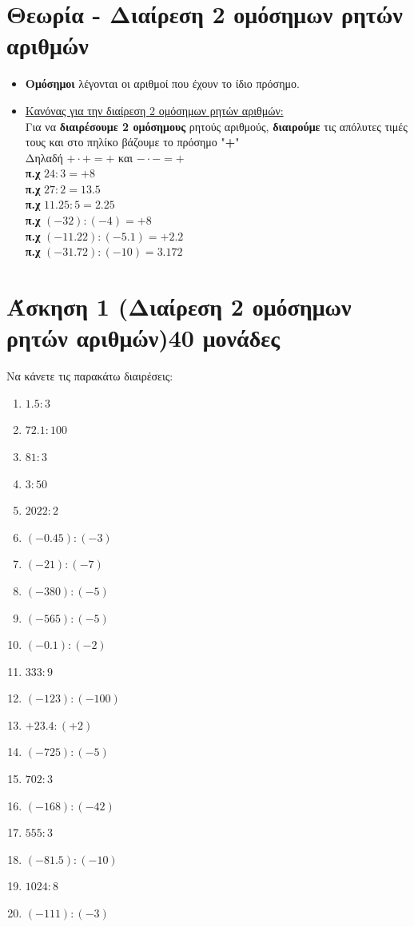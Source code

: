\documentclass[a4paper,10pt]{report}
\begin{document}
\section*{Θεωρία - Διαίρεση 2 ομόσημων ρητών αριθμών\hfill \small{}}
\begin{itemize}
 \item \textbf{Ομόσημοι} λέγονται οι αριθμοί που έχουν το ίδιο πρόσημο. 
 \item \underline{ Κανόνας για την διαίρεση 2 ομόσημων ρητών αριθμών:} \\
       Για να \textbf{διαιρέσουμε 2 ομόσημους} ρητούς αριθμούς, 
       \textbf{διαιρούμε} τις απόλυτες τιμές τους και στο πηλίκο βάζουμε το πρόσημο "\textbf{+}"\\
       Δηλαδή $+\cdot +=+$ και $-\cdot -=+$\\
       \textbf{π.χ} $24:3=+8$\\
       \textbf{π.χ} $27:2=13.5$\\
       \textbf{π.χ} $11.25:5=2.25$ \\
       \textbf{π.χ} $(-32):(-4)=+8$ \\
       \textbf{π.χ} $(-11.22):(-5.1)=+2.2$ \\
       \textbf{π.χ} $(-31.72):(-10)=3.172$ \\
\end{itemize}


\section*{Άσκηση 1  (Διαίρεση 2 ομόσημων ρητών αριθμών)\hfill \small{40 μονάδες}}
Να κάνετε τις παρακάτω διαιρέσεις:
\begin{multicols}{2}
\begin{enumerate}[1)]
 \item $1.5:3$
 \item $72.1:100$
 \item $81:3$
 \item $3:50$
 \item $2022:2$
 \item $(-0.45):(-3)$
 \item $(-21):(-7)$
 \item $(-380):(-5)$
 \item $(-565):(-5)$
 \item $(-0.1):(-2)$
 \item $333:9$
 \item $(-123):(-100)$
 \item $+23.4:(+2)$
 \item $(-725):(-5)$
 \item $702:3$
 \item $(-168):(-42)$
 \item $555:3$
 \item $(-81.5):(-10)$
 \item $1024:8$
 \item $(-111):(-3)$
\end{enumerate}
\end{multicols}
\end{document}
